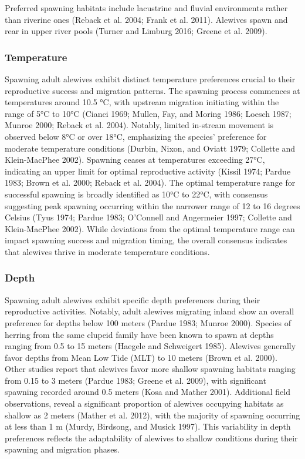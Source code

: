 \documentclass[
]{book}
\begin{document}
Preferred spawning habitats include lacustrine and fluvial environments rather than riverine ones (Reback et al. 2004; Frank et al. 2011). Alewives spawn and rear in upper river pools (Turner and Limburg 2016; Greene et al. 2009).

\hypertarget{temperature}{%
\subsubsection{Temperature}\label{temperature}}

Spawning adult alewives exhibit distinct temperature preferences crucial to their reproductive success and migration patterns. The spawning process commences at temperatures around 10.5 °C, with upstream migration initiating within the range of 5°C to 10°C (Cianci 1969; Mullen, Fay, and Moring 1986; Loesch 1987; Munroe 2000; Reback et al. 2004). Notably, limited in-stream movement is observed below 8°C or over 18°C, emphasizing the species' preference for moderate temperature conditions (Durbin, Nixon, and Oviatt 1979; Collette and Klein-MacPhee 2002). Spawning ceases at temperatures exceeding 27°C, indicating an upper limit for optimal reproductive activity (Kissil 1974; Pardue 1983; Brown et al. 2000; Reback et al. 2004). The optimal temperature range for successful spawning is broadly identified as 10°C to 22°C, with consensus suggesting peak spawning occurring within the narrower range of 12 to 16 degrees Celsius (Tyus 1974; Pardue 1983; O'Connell and Angermeier 1997; Collette and Klein-MacPhee 2002). While deviations from the optimal temperature range can impact spawning success and migration timing, the overall consensus indicates that alewives thrive in moderate temperature conditions.

\hypertarget{depth}{%
\subsubsection{Depth}\label{depth}}

Spawning adult alewives exhibit specific depth preferences during their reproductive activities. Notably, adult alewives migrating inland show an overall preference for depths below 100 meters (Pardue 1983; Munroe 2000). Species of herring from the same clupeid family have been known to spawn at depths ranging from 0.5 to 15 meters (Haegele and Schweigert 1985). Alewives generally favor depths from Mean Low Tide (MLT) to 10 meters (Brown et al. 2000). Other studies report that alewives favor more shallow spawning habitats ranging from 0.15 to 3 meters (Pardue 1983; Greene et al. 2009), with significant spawning recorded around 0.5 meters (Kosa and Mather 2001). Additional field observations, reveal a significant proportion of alewives occupying habitats as shallow as 2 meters (Mather et al. 2012), with the majority of spawning occurring at less than 1 m (Murdy, Birdsong, and Musick 1997). This variability in depth preferences reflects the adaptability of alewives to shallow conditions during their spawning and migration phases.
\end{document}
